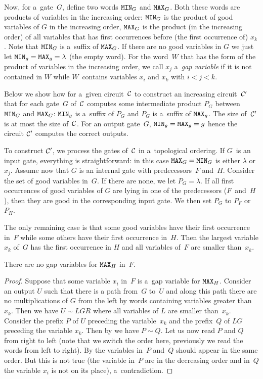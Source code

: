 \documentclass{toc}
\begin{document}
Now, for a~gate~$G$, define two words $\texttt{MIN}_G$ and $\texttt{MAX}_G$. Both these words are products of variables in the increasing order: $\texttt{MIN}_G$ is the product of good variables of $G$ in the increasing order, $\texttt{MAX}_G$ is the product (in the increasing order) of all variables that has first occurrences before (the first occurrence of) $x_k$. Note that $\texttt{MIN}_G$ is
a~suffix of $\texttt{MAX}_G$. If there are no good variables in $G$ we just let $\texttt{MIN}_g=\texttt{MAX}_g=\lambda$ (the empty word).
%
For the word~$W$ that has the form of the product of variables in the increasing order, we call $x_j$ a~\emph{gap variable} if it is not contained in $W$
while $W$~contains variables $x_i$ and $x_k$ with $i < j < k$.

Below we show how for a~given circuit~${\cal C}$ to construct an increasing circuit~${\cal C}'$ that for each gate~$G$ of~${\cal C}$ computes some intermediate product $P_G$ between $\texttt{MIN}_G$ and $\texttt{MAX}_G$: $\texttt{MIN}_g$ is a~suffix of $P_G$ and $P_G$ is a~suffix of $\texttt{MAX}_g$. The size of~${\cal C}'$ is at most the size of~${\cal C}$. For an output gate~$G$, $\texttt{MIN}_g=\texttt{MAX}_g=g$ hence the circuit ${\cal C}'$ computes the correct outputs.

To construct ${\cal C}'$, we process the gates of~${\cal C}$ in a~topological ordering. If $G$~is an input gate, everything is straightforward: in this case $\texttt{MAX}_G=\texttt{MIN}_G$ is either $\lambda$ or $x_j$. Assume now that $G$ is an internal gate with predecessors~$F$ and~$H$.
Consider the set of good variables in~$G$. If there are none, we let $P_G=\lambda$. If all first occurrences of good variables of $G$ are lying in one of the predecessors ($F$~and~$H$), then they are good in the corresponding input gate. We then set $P_G$ to $P_F$ or $P_H$.

The only remaining case is that some good variables have their first occurrence in~$F$ while some others have their first occurrence in~$H$. Then the largest variable $x_k$ of~$G$ has the first occurrence in $H$ and all variables of~$F$ are smaller than~$x_k$.

\begin{claim} \label{cl: h is good}
    There are no gap variables for $\texttt{MAX}_H$ in~$F$.
\end{claim}

\begin{proof}
    Suppose that some variable $x_i$ in~$F$ is a~gap variable for $\texttt{MAX}_H$. Consider an output $U$ such that there is a path from~$G$ to~$U$ and along this path there are no multiplications of $G$ from the left by words containing variables greater than~$x_k$. Then we have $U \sim LGR$ where all variables of $L$ are smaller than~$x_k$. Consider the prefix $P$ of $U$ preceding the variable~$x_k$ and the prefix~$Q$ of $LG$ preceding the variable $x_k$.
    Then by  we have $P \sim Q$. Let us now read $P$ and $Q$ from right to left (note that we switch the order here, previously we read the words from left to right). By  the variables in~$P$ and~$Q$ should appear in the same order. But this is not true (the variable in~$P$ are in the decreasing order and in~$Q$ the variable $x_i$ is not on its place), a~contradiction.
\end{proof}
\end{document}

